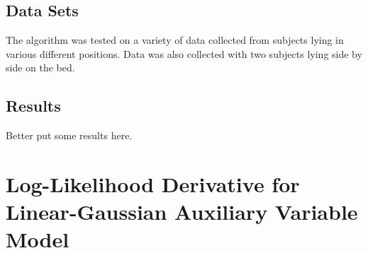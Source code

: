 \documentclass{article}
\begin{document}
\subsection{Data Sets}

The algorithm was tested on a variety of data collected from subjects lying in various different positions. Data was also collected with two subjects lying side by side on the bed.

\subsection{Results}

{\meta Better put some results here.}



\appendix

\section{Log-Likelihood Derivative for Linear-Gaussian Auxiliary Variable Model} \label{app:log-lhood-derivative}
\end{document}
